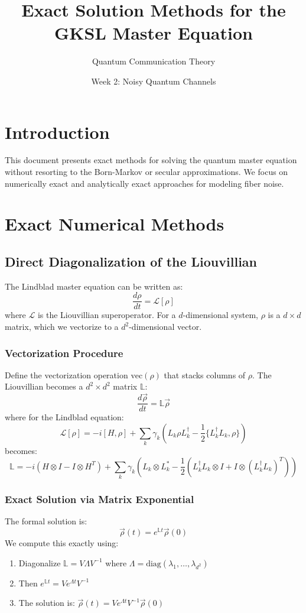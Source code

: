 \documentclass[12pt]{article}
\title{Exact Solution Methods for the GKSL Master Equation}
\author{Quantum Communication Theory}
\date{Week 2: Noisy Quantum Channels}
\begin{document}
\maketitle

\section{Introduction}
This document presents exact methods for solving the quantum master equation without resorting to the Born-Markov or secular approximations. We focus on numerically exact and analytically exact approaches for modeling fiber noise.

\section{Exact Numerical Methods}

\subsection{Direct Diagonalization of the Liouvillian}

The Lindblad master equation can be written as:
\[
\frac{d\rho}{dt} = \mathcal{L}[\rho]
\]
where $\mathcal{L}$ is the Liouvillian superoperator. For a $d$-dimensional system, $\rho$ is a $d \times d$ matrix, which we vectorize to a $d^2$-dimensional vector.

\subsubsection{Vectorization Procedure}
Define the vectorization operation $\text{vec}(\rho)$ that stacks columns of $\rho$. The Liouvillian becomes a $d^2 \times d^2$ matrix $\mathbb{L}$:
\[
\frac{d\vec{\rho}}{dt} = \mathbb{L} \vec{\rho}
\]
where for the Lindblad equation:
\[
\mathcal{L}[\rho] = -i[H, \rho] + \sum_k \gamma_k \left( L_k \rho L_k^\dagger - \frac{1}{2}\{L_k^\dagger L_k, \rho\} \right)
\]
becomes:
\[
\mathbb{L} = -i(H \otimes I - I \otimes H^T) + \sum_k \gamma_k \left( L_k \otimes L_k^* - \frac{1}{2}(L_k^\dagger L_k \otimes I + I \otimes (L_k^\dagger L_k)^T) \right)
\]

\subsubsection{Exact Solution via Matrix Exponential}
The formal solution is:
\[
\vec{\rho}(t) = e^{\mathbb{L} t} \vec{\rho}(0)
\]
We compute this exactly using:
\begin{enumerate}
    \item Diagonalize $\mathbb{L} = V \Lambda V^{-1}$ where $\Lambda = \text{diag}(\lambda_1, \ldots, \lambda_{d^2})$
    \item Then $e^{\mathbb{L} t} = V e^{\Lambda t} V^{-1}$
    \item The solution is: $\vec{\rho}(t) = V e^{\Lambda t} V^{-1} \vec{\rho}(0)$
\end{enumerate}
\end{document}
